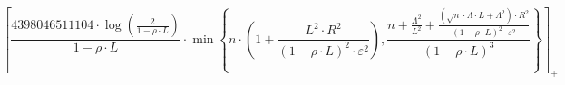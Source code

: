 \[\left\lceil \frac{4398046511104 \cdot \log\left(\frac{2}{1 - \rho \cdot L}\right)}{1 - \rho \cdot L} \cdot \min\left\{ n \cdot \left(1 + \frac{L^{2} \cdot R^{2}}{\left(1 - \rho \cdot L\right)^{2} \cdot \varepsilon^{2}}\right), \frac{n + \frac{\Lambda^{2}}{L^{2}} + \frac{\left(\sqrt{n} \cdot \Lambda \cdot L + \Lambda^{2}\right) \cdot R^{2}}{\left(1 - \rho \cdot L\right)^{2} \cdot \varepsilon^{2}}}{\left(1 - \rho \cdot L\right)^{3}} \right\} \right\rceil_{+}\]
